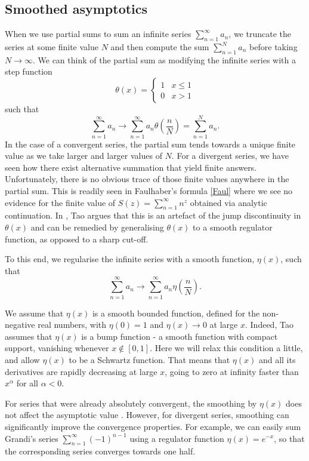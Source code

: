 \documentclass[12pt, letter]{article}
\def\be{\begin{equation}}
\def\ee{\end{equation}}
\begin{document}
\subsection{Smoothed asymptotics}\label{SectTaosmoothasymptotics}
When we use partial sums to sum an infinite series $\sum_{n=1}^\infty a_n$, we truncate the series at some finite value $N$ and then compute the sum $\sum_{n=1}^N a_n$ before taking $N \to \infty$. We can think of the partial sum as modifying the infinite series with a step function  
\be
\theta(x)=\begin{cases} 
1 & x \leq 1  \\
0  &x>1
\end{cases}
\ee
such that
\be
\sum_{n=1}^\infty a_n \to \sum_{n=1}^\infty a_n \theta\left(\frac{n}{N}\right)=\sum_{n=1}^N a_n.
\ee
In the case of a convergent series, the partial sum  tends towards a unique finite value  as we take larger and larger values of $N$.  For a divergent series, we have seen how there exist alternative summation that yield finite answers. Unfortunately, there is no obvious trace of those finite values anywhere in the partial sum.  This is readily seen in Faulhaber's formula \eqref{Faul} where we see no evidence for the finite value of $S(z)=\sum_{n=1}^\infty n^z$ obtained via analytic continuation. In \cite{Tao11}, Tao argues that this is an artefact of the jump discontinuity in $\theta(x)$ and can be remedied by generalising $\theta(x)$ to a smooth regulator function, as opposed to a sharp cut-off. 

To this end, we regularise the infinite series with a smooth function, $\eta(x)$, such that
\be
\sum_{n=1}^\infty a_n \to \sum_{n=1}^\infty a_n \eta\left(\frac{n}{N}\right). 
\ee
%


We assume that  $\eta(x)$ is  a smooth bounded function, defined for the non-negative real numbers, with $\eta(0) = 1$ and $\eta(x) \to 0$ at large $x$.  Indeed, Tao assumes that $\eta(x)$ is a bump function - a smooth function with compact support, vanishing whenever $x \notin [0,1]$.  Here we will relax this condition a little, and allow $\eta(x)$ to be a Schwartz function. That means that $\eta(x)$ and all its derivatives are rapidly decreasing at large $x$,  going to zero at infinity faster than $x^{\alpha}$ for all $\alpha < 0$.



For series that were already absolutely convergent, the smoothing by $\eta(x)$  does not affect the asymptotic value \cite{Tao11}. However, for divergent series, smoothing can significantly improve the convergence properties.  For example, we can  easily sum Grandi's series $\sum_{n=1}^\infty (-1)^{n-1}$ using a regulator function $\eta(x)=e^{-x}$, so that the corresponding series converges towards one half. 
\end{document}
